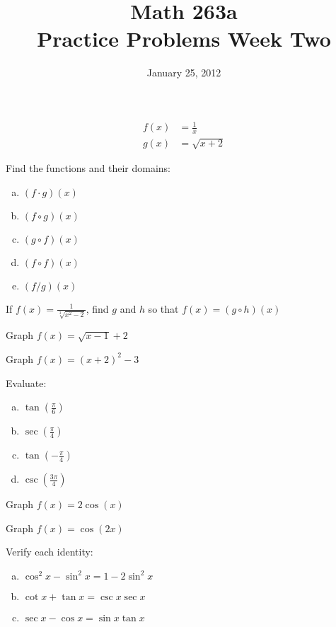 \documentclass{exam}
\title{Math 263a \\ Practice Problems Week Two}
\date{January 25, 2012}
\begin{document}
\maketitle

\begin{questions}
\question
\begin{align*}
  f(x) &= \frac{1}{x} \\
  g(x) &= \sqrt{x + 2}
\end{align*}

Find the functions and their domains:
\begin{enumerate}[(a)]

\item $(f \cdot g)(x)$
\item $(f \circ g)(x)$
\item $(g \circ f)(x)$
\item $(f \circ f)(x)$
\item $(f/g)(x)$

\end{enumerate}


\question
If $f(x) = \frac{1}{\sqrt[3]{x^2 - 2}}$, find $g$ and $h$ so that $f(x) = (g \circ h)(x)$


\question
Graph $f(x) = \sqrt{x - 1} + 2$

\question
Graph $f(x) = (x + 2)^2 - 3$

\question
Evaluate:
\begin{enumerate}[(a)]
\item $\tan \left( \frac{\pi}{6} \right)$
\item $\sec \left( \frac{\pi}{4} \right)$
\item $\tan \left( -\frac{\pi}{4} \right)$
\item $\csc \left( \frac{3\pi}{4} \right)$
\end{enumerate}

\question
Graph $f(x) = 2 \cos(x)$

\question
Graph $f(x) = \cos(2x)$

\question
Verify each identity:
\begin{enumerate}[(a)]

\item $\cos^2 x - \sin^2 x = 1 - 2 \sin^2 x$

\item $\cot x + \tan x = \csc x \sec x$

\item $\sec x - \cos x = \sin x \tan x$

\end{enumerate}
\end{questions}
\end{document}

